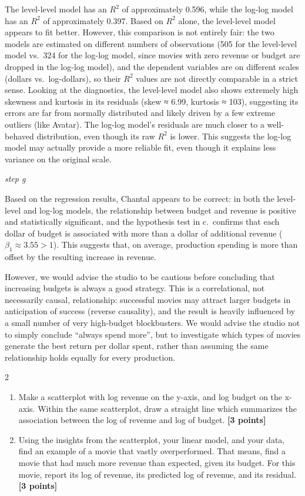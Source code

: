 \documentclass[
]{article}
\providecommand{\tightlist}{%
  \setlength{\itemsep}{0pt}\setlength{\parskip}{0pt}}
\begin{document}
The level-level model has an \(R^2\) of approximately 0.596, while the
log-log model has an \(R^2\) of approximately 0.397. Based on \(R^2\)
alone, the level-level model appears to fit better. However, this
comparison is not entirely fair: the two models are estimated on
different numbers of observations (505 for the level-level model vs.~324
for the log-log model, since movies with zero revenue or budget are
dropped in the log-log model), and the dependent variables are on
different scales (dollars vs.~log-dollars), so their \(R^2\) values are
not directly comparable in a strict sense. Looking at the diagnostics,
the level-level model also shows extremely high skewness and kurtosis in
its residuals (skew ≈ 6.99, kurtosis ≈ 103), suggesting its errors are
far from normally distributed and likely driven by a few extreme
outliers (like Avatar). The log-log model's residuals are much closer to
a well-behaved distribution, even though its raw \(R^2\) is lower. This
suggests the log-log model may actually provide a more reliable fit,
even though it explains less variance on the original scale.

\emph{step g}

Based on the regression results, Chantal appears to be correct: in both
the level-level and log-log models, the relationship between budget and
revenue is positive and statistically significant, and the hypothesis
test in c.~confirms that each dollar of budget is associated with more
than a dollar of additional revenue (\(\beta_1 \approx 3.55 > 1\)). This
suggests that, on average, production spending is more than offset by
the resulting increase in revenue.

However, we would advise the studio to be cautious before concluding
that increasing budgets is always a good strategy. This is a
correlational, not necessarily causal, relationship: successful movies
may attract larger budgets in anticipation of success (reverse
causality), and the result is heavily influenced by a small number of
very high-budget blockbusters. We would advise the studio not to simply
conclude ``always spend more'', but to investigate which types of movies
generate the best return per dollar spent, rather than assuming the same
relationship holds equally for every production.

2

\begin{enumerate}
\def\labelenumi{\alph{enumi}.}
\tightlist
\item
  Make a scatterplot with log revenue on the y-axis, and log budget on
  the x-axis. Within the same scatterplot, draw a straight line which
  summarizes the association between the log of revenue and log of
  budget. \textbf{[3 points]}
\item
  Using the insights from the scatterplot, your linear model, and your
  data, find an example of a movie that vastly overperformed. That
  means, find a movie that had much more revenue than expected, given
  its budget. For this movie, report its log of revenue, its predicted
  log of revenue, and its residual. \textbf{[3 points]}
\end{enumerate}
\end{document}
